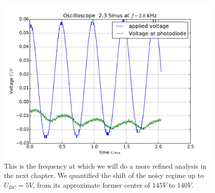 \begin{figure}
    \includegraphics[width=15cm]{analysis/figures/23sinus03}
    \caption{This is the frequency at which we will do a more
        refined analysis in the next chapter. We quantified the
        shift of the noisy regime up to $U_{DC}=5V$, from
        its approximate former center of $145V$ to $140V$.}
\end{figure}
\clearpage
